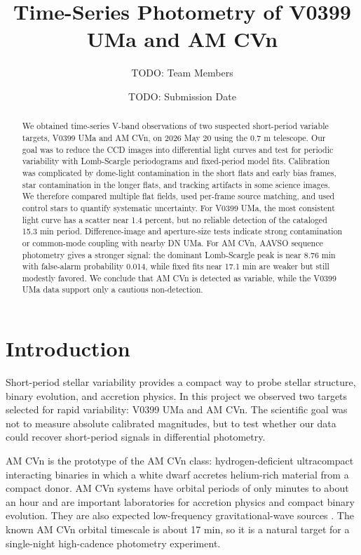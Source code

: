 \documentclass[11pt]{article}
\title{Time-Series Photometry of V0399 UMa and AM CVn}
\author{TODO: Team Members}
\date{TODO: Submission Date}
\begin{document}
\maketitle

\begin{abstract}
We obtained time-series V-band observations of two suspected short-period
variable targets, V0399 UMa and AM CVn, on 2026 May 20 using the 0.7 m
telescope. Our goal was to reduce the CCD images into differential light curves
and test for periodic variability with Lomb-Scargle periodograms and fixed-period
model fits. Calibration was complicated by dome-light contamination in the short
flats and early bias frames, star contamination in the longer flats, and
tracking artifacts in some science images. We therefore compared multiple flat
fields, used per-frame source matching, and used control stars to quantify
systematic uncertainty. For V0399 UMa, the most consistent light curve has a
scatter near 1.4 percent, but no reliable detection of the cataloged 15.3 min
period. Difference-image and aperture-size tests indicate strong contamination
or common-mode coupling with nearby DN UMa. For AM CVn, AAVSO sequence
photometry gives a stronger signal: the dominant Lomb-Scargle peak is near
8.76 min with false-alarm probability 0.014, while fixed fits near 17.1 min are
weaker but still modestly favored. We conclude that AM CVn is detected as
variable, while the V0399 UMa data support only a cautious non-detection.
\end{abstract}

\section{Introduction}

Short-period stellar variability provides a compact way to probe stellar
structure, binary evolution, and accretion physics. In this project we observed
two targets selected for rapid variability: V0399 UMa and AM CVn. The scientific
goal was not to measure absolute calibrated magnitudes, but to test whether our
data could recover short-period signals in differential photometry.

AM CVn is the prototype of the AM CVn class: hydrogen-deficient ultracompact
interacting binaries in which a white dwarf accretes helium-rich material from a
compact donor. AM CVn systems have orbital periods of only minutes to about an
hour and are important laboratories for accretion physics and compact binary
evolution. They are also expected low-frequency gravitational-wave sources
\cite{levitan2013,solheim2010}. The known AM CVn orbital timescale is about
17 min, so it is a natural target for a single-night high-cadence photometry
experiment.
\end{document}
